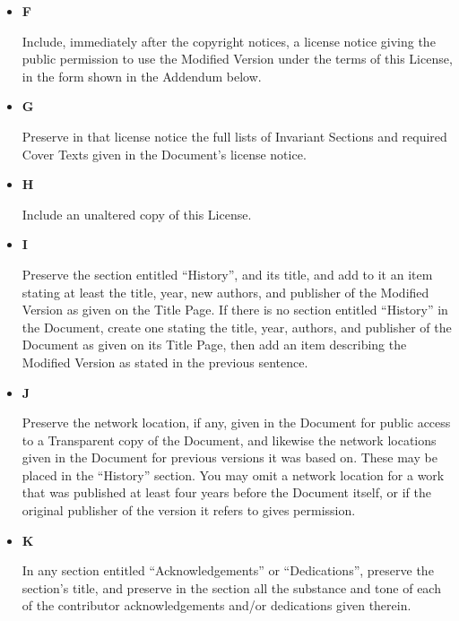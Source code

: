 \begin{itemize}
 
\item \textbf{F}
	  

	    Include, immediately after the copyright notices, a
	    license notice giving the public permission to use the
	    Modified Version under
	    the terms of this License, in the form shown in the
	    Addendum below.
	  

 
\item \textbf{G}
	  

	    Preserve in that license notice the full lists of  Invariant Sections and
	    required Cover
	    Texts given in the Document's license notice.
	  

 
\item \textbf{H}
	  

	    Include an unaltered copy of this License.
	  

 
\item \textbf{I}
	  

	    Preserve the section entitled ``History'', and
	    its title, and add to it an item stating at least the
	    title, year, new authors, and publisher of the Modified Version as given on
	    the Title Page.  If
	    there is no section entitled ``History'' in the
	    Document, create one
	    stating the title, year, authors, and publisher of the
	    Document as given on its Title Page, then add an item
	    describing the Modified Version as stated in the previous
	    sentence.
	  

 
\item \textbf{J}
	  

	    Preserve the network location, if any, given in the Document for public access
	    to a Transparent
	    copy of the Document, and likewise the network locations
	    given in the Document for previous versions it was based
	    on. These may be placed in the ``History''
	    section.  You may omit a network location for a work that
	    was published at least four years before the Document
	    itself, or if the original publisher of the version it
	    refers to gives permission.
	  

 
\item \textbf{K}
	  

	    In any section entitled ``Acknowledgements'' or
	    ``Dedications'', preserve the section's title,
	    and preserve in the section all the substance and tone of
	    each of the contributor acknowledgements and/or
	    dedications given therein.
	  


\end{itemize}
